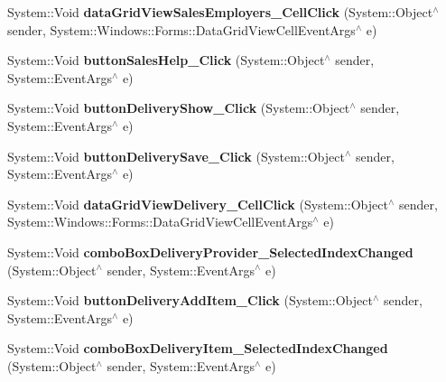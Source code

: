 \begin{DoxyCompactItemize}
System\+::\+Void {\bfseries data\+Grid\+View\+Sales\+Employers\+\_\+\+Cell\+Click} (System\+::\+Object$^\wedge$ sender, System\+::\+Windows\+::\+Forms\+::\+Data\+Grid\+View\+Cell\+Event\+Args$^\wedge$ e)
\item 
\hypertarget{class_magazyn_1_1_magazin_a61b6abbde1a270bb6ea6c5acd33cfbb3}{}\label{class_magazyn_1_1_magazin_a61b6abbde1a270bb6ea6c5acd33cfbb3} 
System\+::\+Void {\bfseries button\+Sales\+Help\+\_\+\+Click} (System\+::\+Object$^\wedge$ sender, System\+::\+Event\+Args$^\wedge$ e)
\item 
\hypertarget{class_magazyn_1_1_magazin_a470525112231ed90bb4b3490afef0191}{}\label{class_magazyn_1_1_magazin_a470525112231ed90bb4b3490afef0191} 
System\+::\+Void {\bfseries button\+Delivery\+Show\+\_\+\+Click} (System\+::\+Object$^\wedge$ sender, System\+::\+Event\+Args$^\wedge$ e)
\item 
\hypertarget{class_magazyn_1_1_magazin_a36d9c12155e637b02e57d4e03c64f850}{}\label{class_magazyn_1_1_magazin_a36d9c12155e637b02e57d4e03c64f850} 
System\+::\+Void {\bfseries button\+Delivery\+Save\+\_\+\+Click} (System\+::\+Object$^\wedge$ sender, System\+::\+Event\+Args$^\wedge$ e)
\item 
\hypertarget{class_magazyn_1_1_magazin_a63f39976669473311f0d90f0ebe77425}{}\label{class_magazyn_1_1_magazin_a63f39976669473311f0d90f0ebe77425} 
System\+::\+Void {\bfseries data\+Grid\+View\+Delivery\+\_\+\+Cell\+Click} (System\+::\+Object$^\wedge$ sender, System\+::\+Windows\+::\+Forms\+::\+Data\+Grid\+View\+Cell\+Event\+Args$^\wedge$ e)
\item 
\hypertarget{class_magazyn_1_1_magazin_a65f10a20ee2ec7e9bd61f135a9a6a6db}{}\label{class_magazyn_1_1_magazin_a65f10a20ee2ec7e9bd61f135a9a6a6db} 
System\+::\+Void {\bfseries combo\+Box\+Delivery\+Provider\+\_\+\+Selected\+Index\+Changed} (System\+::\+Object$^\wedge$ sender, System\+::\+Event\+Args$^\wedge$ e)
\item 
\hypertarget{class_magazyn_1_1_magazin_afc5fd76c2e80b61860792e888ca95a82}{}\label{class_magazyn_1_1_magazin_afc5fd76c2e80b61860792e888ca95a82} 
System\+::\+Void {\bfseries button\+Delivery\+Add\+Item\+\_\+\+Click} (System\+::\+Object$^\wedge$ sender, System\+::\+Event\+Args$^\wedge$ e)
\item 
\hypertarget{class_magazyn_1_1_magazin_aa37b356b4140df20b260b34162d7a6db}{}\label{class_magazyn_1_1_magazin_aa37b356b4140df20b260b34162d7a6db} 
System\+::\+Void {\bfseries combo\+Box\+Delivery\+Item\+\_\+\+Selected\+Index\+Changed} (System\+::\+Object$^\wedge$ sender, System\+::\+Event\+Args$^\wedge$ e)

\end{DoxyCompactItemize}
